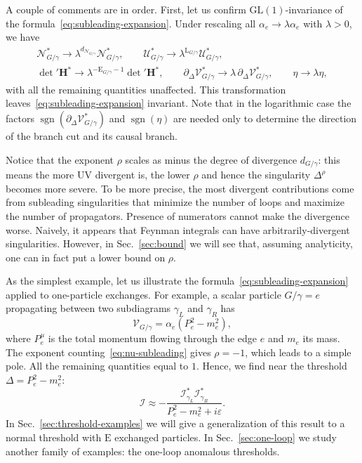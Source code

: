 \documentclass[12pt]{article}
\numberwithin{figure}{section}
\DeclareMathOperator{\sgn}{sgn}
\def \be {\begin{equation}}
\def \ee {\end{equation}}
\def \E {\mathrm{E}}
\def \L {\mathrm{L}}
\def \U {\mathcal{U}}
\def \eps {\varepsilon}
\def \V {\mathcal{V}}
\def \I {\mathcal{I}}
\def \GL {\mathrm{GL}}
\def \N {\mathcal{N}}
\def \RR {\mathcal{I}^\ast}
\def \upgamma {\rho}
\begin{document}
				A couple of comments are in order. First, let us confirm $\GL(1)$-invariance of the formula~\eqref{eq:subleading-expansion}. Under rescaling all $\alpha_e \to \lambda \alpha_e$ with $\lambda > 0$, we have
				\begin{gather}
				\N_{G/\gamma}^\ast \to \lambda^{d_{\N_{G/\gamma}}} \N_{G/\gamma}^\ast, \qquad \U_{G/\gamma}^\ast \to \lambda^{\L_{G/\gamma}} \U_{G/\gamma}^\ast,\\
				{\det}' \mathbf{H}^\ast \to  \lambda^{-\E_{G/\gamma}-1} {\det}' \mathbf{H}^\ast, \qquad
				\partial_{\Delta} \V_{G/\gamma}^\ast \to \lambda\, \partial_{\Delta} \V_{G/\gamma}^\ast, \qquad \eta \to \lambda \eta,
				\end{gather}
				with all the remaining quantities unaffected. This transformation leaves~\eqref{eq:subleading-expansion} invariant. Note that in the logarithmic case the factors $\sgn(\partial_\Delta \V_{G/\gamma}^\ast)$ and $\sgn(\eta)$ are needed only to determine the direction of the branch cut and its causal branch.
				
				Notice that the exponent $\upgamma$ scales as minus the degree of divergence $d_{G/\gamma}$: this means the more UV divergent is, the lower $\rho$ and hence the singularity $\Delta^\rho$ becomes more severe. To be more precise, the most divergent contributions come from subleading singularities that minimize the number of loops and maximize the number of propagators. Presence of numerators cannot make the divergence worse. Naively, it appears that Feynman integrals can have arbitrarily-divergent singularities. 
				However, in Sec.~\ref{sec:bound} we will see that, assuming analyticity, one can in fact put a lower bound on $\rho$.
				
				As the simplest example, let us illustrate the formula~\eqref{eq:subleading-expansion} applied to one-particle exchanges. For example, a scalar particle $G/\gamma = e$ propagating between two subdiagrams $\gamma_L$ and $\gamma_R$ has
				\be
				\V_{G/\gamma} = \alpha_e (P_e^2 - m_e^2),
				\ee
				where $P_e^\mu$ is the total momentum flowing through the edge $e$ and $m_e$ its mass.
				The exponent counting~\eqref{eq:nu-subleading} gives 
				$\upgamma = -1$, which leads to a simple pole. All the remaining quantities equal to $1$. Hence, we find near the threshold $\Delta = P_e^2 - m_e^2$:
				\be\label{eq:exchange}
				\I \approx - \frac{\RR_{\gamma_L} \RR_{\gamma_R}}{P_e^2 - m_e^2 + i\eps}.
				\ee
				In Sec.~\ref{sec:threshold-examples} we will give a generalization of this result to a normal threshold with $\E$ exchanged particles. In Sec.~\ref{sec:one-loop} we study another family of examples: the one-loop anomalous thresholds.
				
\end{document}
